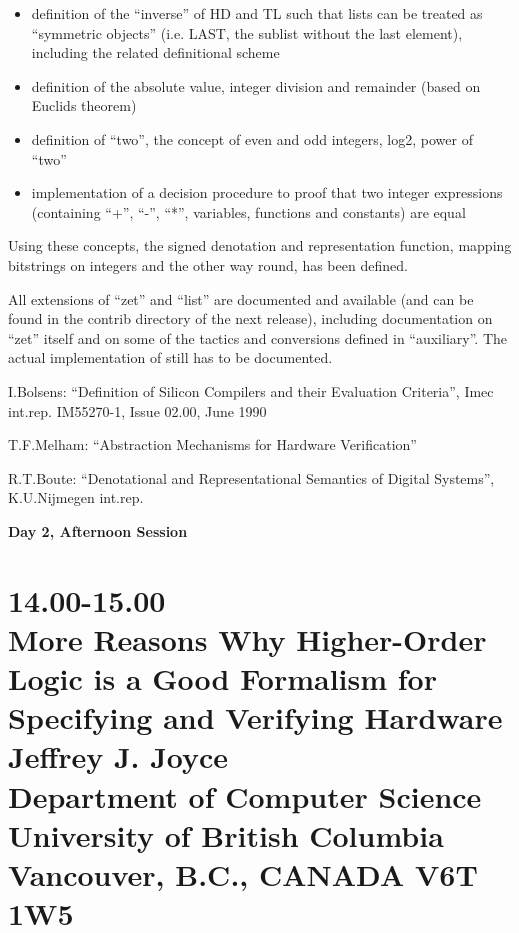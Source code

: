\begin{itemize}

\item definition of the ``inverse'' of HD and TL 
      such that lists can be treated as ``symmetric objects'' (i.e. LAST, 
      the sublist without the last element), including the related
      definitional scheme

\item definition of the absolute value, integer division and remainder
      (based on Euclids theorem)

\item definition of ``two'', the concept of even and odd integers, log2, 
      power of ``two''

\item implementation of a decision procedure to proof that two integer
      expressions (containing ``+'', ``-'', ``*'', variables, functions and
      constants) are equal

\end{itemize}

Using these concepts, the signed denotation and representation function,
mapping bitstrings on integers and the other way round, has been defined.

All extensions of ``zet'' and ``list'' are documented and available
(and can be found in the contrib directory of the next release), including
documentation on ``zet'' itself and on some of the tactics and conversions 
defined in ``auxiliary''. The actual implementation of \cite{raymond} still
has to be documented. 


\begin{thebibliography}{10}

  I.Bolsens: 
  ``Definition of Silicon Compilers and their Evaluation Criteria'',
  Imec int.rep. IM55270-1, Issue 02.00, June 1990

  T.F.Melham: 
  ``Abstraction Mechanisms for Hardware Verification''

  R.T.Boute: 
  ``Denotational and Representational Semantics of Digital Systems'',
  K.U.Nijmegen int.rep.

\end{thebibliography}

\newpage
\begin{center}\Large\bf
Day 2, Afternoon Session
\end{center}

\section*{14.00-15.00\\
More Reasons Why Higher-Order Logic is a Good Formalism
for Specifying and Verifying Hardware\\
Jeffrey J. Joyce\\
\large\bf 
Department of Computer Science\\
University of British Columbia\\
Vancouver, B.C., CANADA V6T 1W5}

